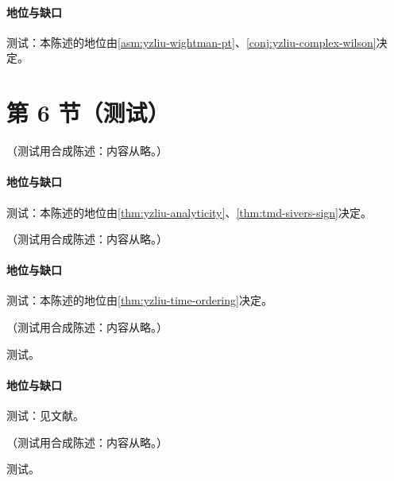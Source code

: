 \paragraph{地位与缺口}测试：本陈述的地位由\cref{asm:yzliu-wightman-pt}、\cref{conj:yzliu-complex-wilson}决定。

\section{第 6 节（测试）}\label{sec:yzliu-quasi-tmd}

\begin{proposition}\label{prop:yzliu-dy-sidis-exp}
（测试用合成陈述：内容从略。）
\end{proposition}
\paragraph{地位与缺口}测试：本陈述的地位由\cref{thm:yzliu-analyticity}、\cref{thm:tmd-sivers-sign}决定。

\begin{conjecture}\label{conj:yzliu-complex-wilson}
（测试用合成陈述：内容从略。）
\end{conjecture}
\paragraph{地位与缺口}测试：本陈述的地位由\cref{thm:yzliu-time-ordering}决定。

\begin{proposition}\label{prop:yzliu-qtmd-powercount}
（测试用合成陈述：内容从略。）
\end{proposition}
\begin{proofsketch}测试。\end{proofsketch}
\paragraph{地位与缺口}测试：见文献。

\begin{proposition}\label{prop:yzliu-hard-kernel}
（测试用合成陈述：内容从略。）
\end{proposition}
\begin{proofsketch}测试。\end{proofsketch}
